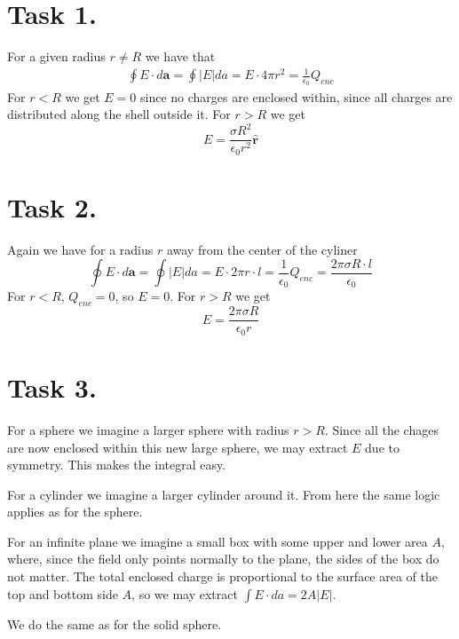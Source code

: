 \documentclass[a4paper,11pt]{article}
\begin{document}


\section*{Task 1.}
For a given radius $r \neq R$ we have that
\begin{align*}
    \oint E \cdot d\mathbf{a} = \oint |E| da = E \cdot 4\pi r^2 = \frac{1}{\epsilon_0} Q_{enc}
\end{align*}
For $r < R$ we get $E = 0$ since no charges are enclosed within, since all charges are distributed along the shell outside it.
For $r > R$ we get 
\[
    E = \frac{\sigma R^2}{\epsilon_0 r^2}\mathbf{\hat{r}}
\]

\section*{Task 2.}
Again we have for a radius $r$ away from the center of the cyliner
\[
    \oint E \cdot d\mathbf{a} = \oint |E| da = E \cdot 2\pi r \cdot l = \frac{1}{\epsilon_0}Q_{enc} = \frac{2 \pi \sigma R \cdot l}{\epsilon_0}
\]
For $r < R$, $Q_{enc} = 0$, so $E = 0$. For $r > R$ we get
\[
    E = \frac{2\pi \sigma R}{\epsilon_0 r}
\]

\section*{Task 3.}
\begin{romanlist}
    \item For a sphere we imagine a larger sphere with radius $r > R$. Since all the chages are now enclosed within this new 
        large sphere, we may extract $E$ due to symmetry. This makes the integral easy.
    \item For a cylinder we imagine a larger cylinder around it. From here the same logic applies as for the sphere.
    \item For an infinite plane we imagine a small box with some upper and lower area $A$, where, since the field only points normally 
        to the plane, the sides of the box do not matter. The total enclosed charge is proportional to the surface area of the top and bottom 
        side $A$, so we may extract $\int E \cdot da = 2A|E|$.
    \item We do the same as for the solid sphere.
\end{romanlist}
\end{document}
